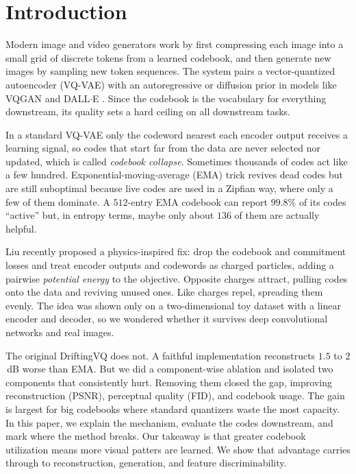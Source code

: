 \documentclass[10pt,twocolumn,letterpaper]{article}
\begin{document}
\section{Introduction}

Modern image and video generators work by first compressing each image into a small grid of discrete tokens from a learned codebook, and then generate new images by sampling new token sequences. The system pairs a vector-quantized autoencoder (VQ-VAE) with an autoregressive or diffusion prior in models like VQGAN and DALL$\cdot$E \cite{vqvae,vqgan,dalle}. Since the codebook is the vocabulary for everything downstream, its quality sets a hard ceiling on all downstream tasks.

In a standard VQ-VAE only the codeword nearest each encoder output receives a learning signal, so codes that start far from the data are never selected nor updated, which is called \emph{codebook collapse}. Sometimes thousands of codes act like a few hundred. Exponential-moving-average (EMA) trick revives dead codes but are still suboptimal because live codes are used in a Zipfian way, where only a few of them dominate. A $512$-entry EMA codebook can report $99.8\%$ of its codes ``active'' but, in entropy terms, maybe only about $136$ of them are actually helpful.

Liu \cite{liu2026drift} recently proposed a physics-inspired fix: drop the codebook and commitment losses and treat encoder outputs and codewords as charged particles, adding a pairwise \emph{potential energy} to the objective. Opposite charges attract, pulling codes onto the data and reviving unused ones. Like charges repel, spreading them evenly. The idea was shown only on a two-dimensional toy dataset with a linear encoder and decoder, so we wondered whether it survives deep convolutional networks and real images.

The original DriftingVQ does not. A faithful implementation reconstructs $1.5$ to $2$\,dB worse than EMA. But we did a component-wise ablation and isolated two components that consistently hurt. Removing them closed the gap, improving reconstruction (PSNR), perceptual quality (FID), and codebook usage. The gain is largest for big codebooks where standard quantizers waste the most capacity. In this paper, we explain the mechanism, evaluate the codes downstream, and mark where the method breaks. Our takeaway is that greater codebook utilization means more visual patters are learned. We show that advantage carries through to reconstruction, generation, and feature discriminability.
\end{document}
